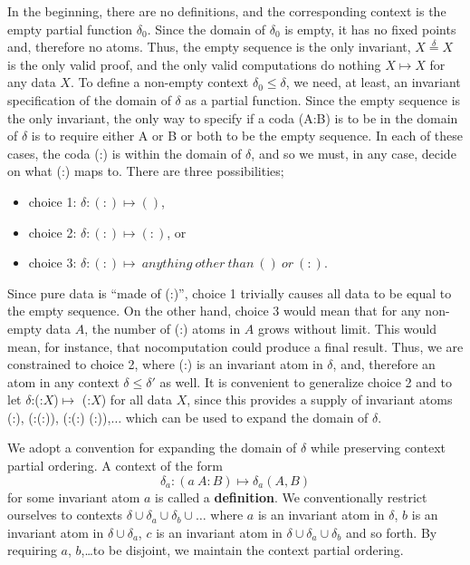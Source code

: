 \documentclass[11pt]{article}
\begin{document}
     In the beginning, there are no definitions, and the corresponding context is the empty partial function $\delta_0$.  
Since the domain of $\delta_0$ is empty, it has no fixed points and, therefore no atoms.  Thus, the empty sequence is the only invariant, 
$X{\overset \delta =}X$ is the only valid proof, and the only valid 
 computations do nothing $X\mapsto X$ for any data $X$.
To define a non-empty context $\delta_0\le\delta$, we need, at least, an invariant specification of the domain of $\delta$ as a partial function.    
Since the empty sequence is the only invariant, the only way to specify if a coda (A:B) is to be in the domain of $\delta$ is 
to require either A or B or both to be the empty sequence. In each of these cases, the coda (:) is within the domain of $\delta$, and so we must, in any case, 
decide on what (:) maps to.  There are three possibilities; 
\begin{itemize}
\item[] choice 1: {$\delta: (:) \mapsto ()$},
\item[] choice 2: {$\delta: (:) \mapsto (:)$}, or 
\item[] choice 3: {$\delta: (:) \mapsto \ anything\ other\ than\ ()\ or\ (:)$}. 
\end{itemize}
Since pure data is ``made of (:)'', choice 1 trivially causes all data to be equal to the empty sequence. 
On the other hand, choice 3 would mean that for any non-empty data $A$, the number of (:) atoms in $A$ grows without limit.  This would mean, for instance, 
that nocomputation could produce a final result.  Thus, we are constrained to choice 2, where (:) is an invariant atom in $\delta$, and, therefore an atom in 
any context $\delta\leq\delta'$ as well.  It is convenient to generalize choice 2 and to let $\delta$:(:$X$)$\mapsto$ (:$X$) for all data $X$, since this provides a 
supply of invariant atoms (:), (:(:)), (:(:) (:)),$\dots$ which can be used to expand the domain of $\delta$.  

We adopt a convention for expanding the domain of $\delta$ while preserving context partial ordering. 
A context of the form 
\begin{equation}
	\delta_a: (a\ A:B) \mapsto \delta_a(A,B)
\end{equation}
for some invariant atom $a$ is called a {\bf definition}.  We conventionally restrict ourselves to 
contexts $\delta\cup\delta_a\cup\delta_b\cup\dots$ where $a$ is an invariant atom in $\delta$, $b$ is an invariant atom in $\delta\cup\delta_a$, $c$ is an invariant atom in $\delta\cup\delta_a\cup\delta_b$ and so forth.  By requiring $a$, $b$,\dots to be disjoint, we maintain the context partial ordering.  
\end{document}
